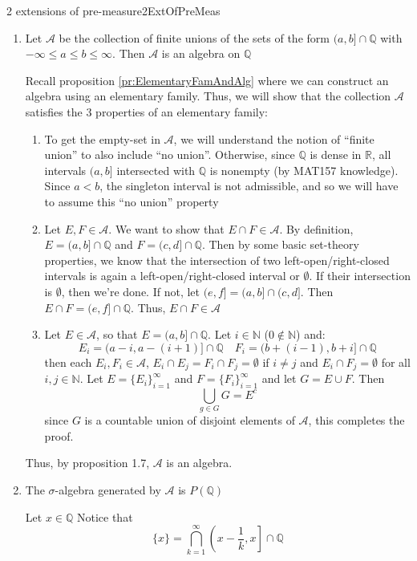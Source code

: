 \documentclass[oneside]{book}
\newcommand{\N}{\mathbb{N}}
\newcommand{\Q}{\mathbb{Q}}
\newcommand{\R}{\mathbb{R}}
\newcommand{\CA}{\mathcal{A}}
\begin{document}
\begin{example}{2 extensions of pre-measure}{2ExtOfPreMeas}
			\begin{enumerate}
				\item Let $\CA$ be the collection of finite unions of the sets of the form $(a,b]\cap \Q$ with $-\infty
					\le a\le b\le \infty$. Then $\CA$ is an algebra on $\Q$ 
		\begin{Proof}
			Recall proposition \ref{pr:ElementaryFamAndAlg} where we can construct an algebra using an elementary family. Thus, we
			will show that the collection $\CA$ satisfies the $3$ properties of an elementary family:
			\begin{enumerate}
				\item To get the empty-set in $\CA$, we will understand the notion of ``finite
					union'' to also include ``no union''. Otherwise, since $\Q$ is dense in $\R$, all
					intervals $(a,b]$ intersected with $\Q$ is nonempty (by MAT157 knowledge). Since $a
					< b$, the singleton interval is not admissible, and so we will have to assume this ``no
					union'' property
				\item Let $E, F \in \CA$. We want to show that $E\cap F \in \CA$. By definition, $E
					= (a,b]\cap \Q$ and $F = (c,d] \cap \Q$. Then by some basic set-theory properties, we
					know that the intersection of two left-open/right-closed intervals is again
					a left-open/right-closed interval or $\emptyset$. If their intersection is $\emptyset$,
					then we're done. If not, let $(e, f] = (a,b] \cap (c, d]$. Then $E\cap F = (e,f]\cap
					\Q$. Thus, $E\cap F \in \CA$
				\item Let $E \in \CA$, so that $E = (a,b] \cap \Q$. Let $i \in \N$ ($0\notin \N$) and:
					\[
						E_i = (a-i, a-(i+1)]\cap \Q \quad F_i = (b+(i-1), b+i]\cap \Q
					\]
					then each $E_i, F_i \in \CA$, $E_i\cap E_j = F_i\cap F_j = \emptyset$ if
					$i \ne j$ and $E_i\cap F_j = \emptyset$ for all $i,j \in \N$. Let $E
					= \{E_i\}_{i=1}^\infty$ and $F = \{F_i\}_{i=1}^\infty$ and let $G = E\cup F$. Then
					\[
						\bigcup_{g \in G} G = E^c
					\]
					since $G$ is a countable union of disjoint elements of $\CA$, this completes the proof.
			\end{enumerate}
			Thus, by proposition 1.7, $\CA$ is an algebra.
		\end{Proof}
	\item The $\sigma$-algebra generated by $\CA$ is $P(\Q)$
		\begin{Proof}
			Let $x \in \Q$ Notice that 
			\[
				\{x\} = \bigcap_{k=1}^\infty \left(x-\frac{1}{k}, x\right] \cap \Q
\]
\end{Proof}
\end{enumerate}
\end{example}
\end{document}
